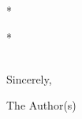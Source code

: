 \documentclass[A4,12pt]{acmemo} %
\begin{document}
\maketitle %


\lipsum

\bigskip
\noindent
*
\begin{center} * \end{center}
\hfill *\\
\noindent
Sincerely,


\bigskip
The Author(s)
\end{document}
